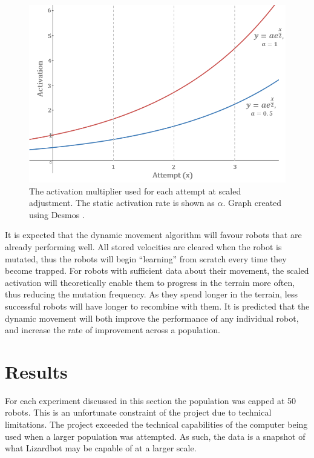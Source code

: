 \documentclass{article}
\begin{document}
\begin{enumerate}
\begin{figure}[H]
\centering
\includegraphics[scale=0.6]{activationFunction}
\caption{The activation multiplier used for each attempt at scaled adjustment. The static activation rate is shown as $\alpha$. Graph created using Desmos \citep{graphs}.}
\end{figure}
\end{enumerate}

It is expected that the dynamic movement algorithm will favour robots that are already performing well. All stored velocities are cleared when the robot is mutated, thus the robots will begin “learning” from scratch every time they become trapped. For robots with sufficient data about their movement, the scaled activation will theoretically enable them to progress in the terrain more often, thus reducing the mutation frequency. As they spend longer in the terrain, less successful robots will have longer to recombine with them. It is predicted that the dynamic movement will both improve the performance of any individual robot, and increase the rate of improvement across a population. \\

\newpage
\section{Results}
\label{sec:Results}
For each experiment discussed in this section the population was capped at 50 robots. This is an unfortunate constraint of the project due to technical limitations. The project exceeded the technical capabilities of the computer being used when a larger population was attempted. As such, the data is a snapshot of what Lizardbot may be capable of at a larger scale.\\
\end{document}
